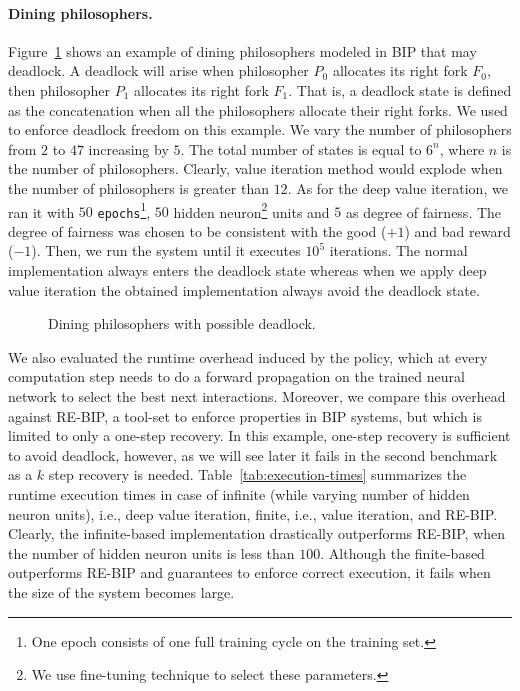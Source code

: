 \paragraph{Dining philosophers.} Figure~\ref{fig:diningbench} shows an example of dining philosophers modeled in BIP that may deadlock. A deadlock will arise when philosopher $P_0$ allocates its right fork $F_0$, then philosopher $P_1$ allocates its right fork $F_1$. That is, a deadlock state is defined as the concatenation when all the philosophers allocate their right forks. We used \rerl to enforce deadlock freedom on this example. We vary the number of philosophers from $2$ to $47$ increasing by $5$. The total number of states is equal to $6^{n}$, where $n$ is the number of philosophers. 
Clearly, value iteration method would explode when the number of philosophers is greater than $12$. 
%
As for the deep value iteration, we ran it with $50$ \texttt{epochs}\footnote{One epoch consists of one full training cycle on the training set.}, $50$ hidden neuron\footnote{We use fine-tuning technique to select these parameters.} units and $5$ as degree of fairness. The degree of fairness was chosen to be consistent with the good ($+1$) and bad reward ($-1$). Then, we run the system until it executes $10^5$ iterations. The normal implementation always enters the deadlock state whereas when we apply deep value iteration the obtained implementation always avoid the deadlock state.  
%
\begin{figure}[t]
\centering
{}
\caption{Dining philosophers with possible deadlock.}
\label{fig:diningbench}
\end{figure}
%
We also evaluated the runtime overhead induced by the policy, which at every computation step needs to do a forward propagation on the trained neural network to select the best next interactions. Moreover, we compare this overhead against RE-BIP, a tool-set to enforce properties in BIP systems, but which is limited to only a one-step recovery. In this example, one-step recovery is sufficient to avoid deadlock, however, as we will see later it fails in the second benchmark as a $k$ step recovery is needed. Table~\ref{tab:execution-times} summarizes the runtime execution times in case of infinite (while varying number of hidden neuron units), i.e., deep value iteration, finite, i.e., value iteration, and RE-BIP. Clearly, the infinite-based implementation drastically outperforms RE-BIP, when the number of hidden neuron units is less than $100$. Although the finite-based outperforms RE-BIP and guarantees to enforce correct execution, it fails when the size of the system becomes large.  
